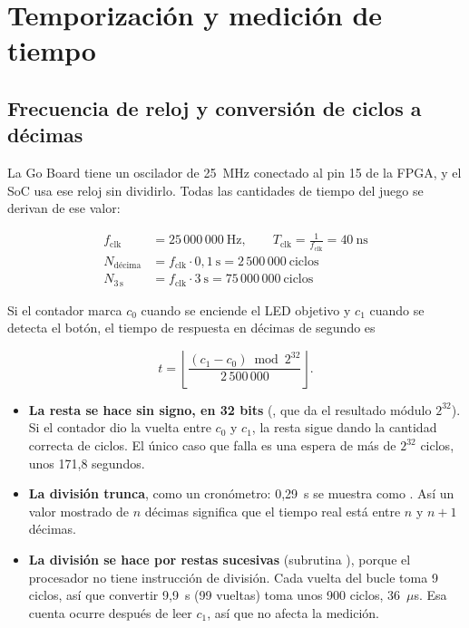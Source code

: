 \section{Temporización y medición de tiempo}
\label{sec:temporizacion}

\subsection{Frecuencia de reloj y conversión de ciclos a décimas}

La Go Board tiene un oscilador de 25~MHz conectado al pin 15 de la FPGA, y el SoC usa
ese reloj sin dividirlo. Todas las cantidades de tiempo del juego se derivan de ese
valor:

\begin{align*}
  f_{\text{clk}} &= 25\,000\,000~\text{Hz}, \qquad T_{\text{clk}} = \frac{1}{f_{\text{clk}}} = 40~\text{ns} \\[4pt]
  N_{\text{décima}} &= f_{\text{clk}} \cdot 0{,}1~\text{s} = 2\,500\,000~\text{ciclos} \\[4pt]
  N_{3\,\text{s}} &= f_{\text{clk}} \cdot 3~\text{s} = 75\,000\,000~\text{ciclos}
\end{align*}

Si el contador marca $c_0$ cuando se enciende el LED objetivo y $c_1$ cuando se detecta
el botón, el tiempo de respuesta en décimas de segundo es

\[
  t = \left\lfloor \frac{(c_1 - c_0) \bmod 2^{32}}{2\,500\,000} \right\rfloor .
\]

\begin{itemize}
  \item \textbf{La resta se hace sin signo, en 32 bits} (, que da el
        resultado módulo $2^{32}$). Si el contador dio la vuelta entre $c_0$ y $c_1$,
        la resta sigue dando la cantidad correcta de ciclos. El único caso que falla
        es una espera de más de $2^{32}$ ciclos, unos 171,8 segundos.
  \item \textbf{La división trunca}, como un cronómetro: 0,29~s se muestra como
        . Así un valor mostrado de $n$ décimas significa que el tiempo real
        está entre $n$ y $n+1$ décimas.
  \item \textbf{La división se hace por restas sucesivas} (subrutina ),
        porque el procesador no tiene instrucción de división. Cada vuelta del bucle
        toma 9 ciclos, así que convertir 9,9~s (99 vueltas) toma unos 900 ciclos,
        36~$\mu$s. Esa cuenta ocurre después de leer $c_1$, así que no afecta la
        medición.
\end{itemize}

